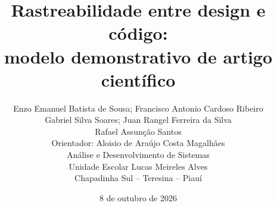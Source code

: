 \title{Rastreabilidade entre design e código:\\modelo demonstrativo de artigo científico}
\author{\small Enzo Emanuel Batista de Sousa; Francisco Antonio Cardoso Ribeiro\\
\small Gabriel Silva Soares; Juan Rangel Ferreira da Silva\\
\small Rafael Assunção Santos\\[0.5em]
\small Orientador: Aloisio de Araújo Costa Magalhães\\
\small Análise e Desenvolvimento de Sistemas\\
\small Unidade Escolar Lucas Meireles Alves\\
\small Chapadinha Sul -- Teresina -- Piauí}
\date{8 de outubro de 2026}
